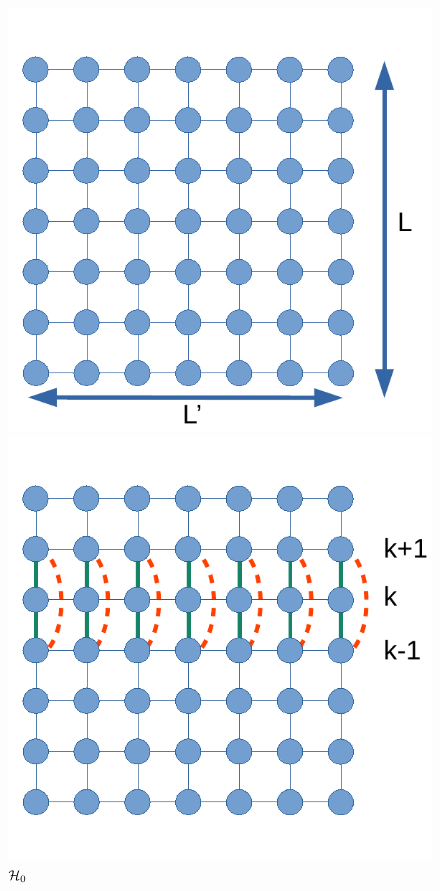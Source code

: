 \begin{figure}
	\begin{minipage}[t]{0.32\linewidth}
		\includegraphics[width=\linewidth]{isingtosos/cross-h0.pdf}
		\caption*{$\mathcal{H}_0$}
	\end{minipage}
	\begin{minipage}[t]{0.32\linewidth}
		\includegraphics[width=\linewidth]{isingtosos/cross-hlambda.pdf}

\end{minipage}
\end{figure}
